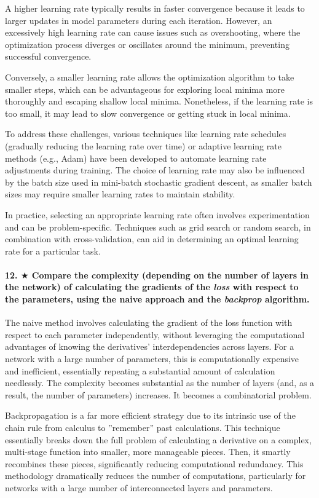 \documentclass{article}
\theoremstyle{plain}%
\theoremstyle{definition}
\theoremstyle{remark}
\begin{document}
A higher learning rate typically results in faster convergence because it leads to larger updates in model parameters during each iteration. However, an excessively high learning rate can cause issues such as overshooting, where the optimization process diverges or oscillates around the minimum, preventing successful convergence.

Conversely, a smaller learning rate allows the optimization algorithm to take smaller steps, which can be advantageous for exploring local minima more thoroughly and escaping shallow local minima. Nonetheless, if the learning rate is too small, it may lead to slow convergence or getting stuck in local minima.

To address these challenges, various techniques like learning rate schedules (gradually reducing the learning rate over time) or adaptive learning rate methods (e.g., Adam) have been developed to automate learning rate adjustments during training. The choice of learning rate may also be influenced by the batch size used in mini-batch stochastic gradient descent, as smaller batch sizes may require smaller learning rates to maintain stability.

In practice, selecting an appropriate learning rate often involves experimentation and can be problem-specific. Techniques such as grid search or random search, in combination with cross-validation, can aid in determining an optimal learning rate for a particular task.

\paragraph{12. $\bigstar$ Compare the complexity (depending on the number of layers in the network) of calculating the gradients of the \textit{loss} with respect to the parameters, using the naive approach and the \textit{backprop} algorithm.}
The naive method involves calculating the gradient of the loss function with respect to each parameter independently, without leveraging the computational advantages of knowing the derivatives' interdependencies across layers. For a network with a large number of parameters, this is computationally expensive and inefficient, essentially repeating a substantial amount of calculation needlessly. The complexity becomes substantial as the number of layers (and, as a result, the number of parameters) increases. It becomes a combinatorial problem.

Backpropagation is a far more efficient strategy due to its intrinsic use of the chain rule from calculus to ''remember'' past calculations. This technique essentially breaks down the full problem of calculating a derivative on a complex, multi-stage function into smaller, more manageable pieces. Then, it smartly recombines these pieces, significantly reducing computational redundancy. This methodology dramatically reduces the number of computations, particularly for networks with a large number of interconnected layers and parameters.
\end{document}
